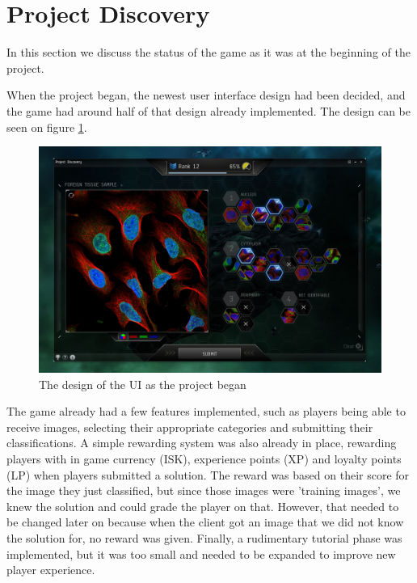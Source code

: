 \section{Project Discovery}\label{sec:project_discovery}
In this section we discuss the status of the game as it was at the beginning of the project.

When the project began, the newest user interface design had been decided, and the game had around half of that design already implemented. The design can be seen on figure \ref{fig:PD}.

\begin{figure}[H]
	\centering
	\graphicspath{ {./graphics/} }
    \centerline{\includegraphics[scale=0.35]{PD.png}}
    \caption{\label{fig:PD}The design of the UI as the project began}
\end{figure}
\clearpage

The game already had a few features implemented, such as players being able to receive images, selecting their appropriate categories and submitting their classifications. A simple rewarding system was also already in place, rewarding players with in game currency (ISK), experience points (XP) and loyalty points (LP) when players submitted a solution. The reward was based on their score for the image they just classified, but since those images were 'training images', we knew the solution and could grade the player on that. However, that needed to be changed later on because when the client got an image that we did not know the solution for, no reward was given. Finally, a rudimentary tutorial phase was implemented, but it was too small and needed to be expanded to improve new player experience.


